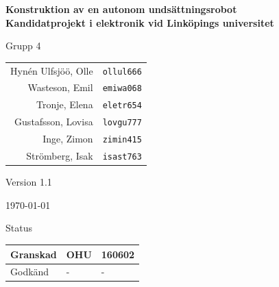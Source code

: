 \documentclass[11pt]{article}
\begin{document}
\begin{titlepage}
\begin{center}

{\Large\bfseries Konstruktion av en autonom undsättningsrobot \\ \small \bfseries Kandidatprojekt i elektronik vid Linköpings universitet}


\begin{figure}[!htbp]
  \begin{center}
\noindent{}
  \end{center}
\end{figure}


  \begin{minipage}{0.5\textwidth}
    \centering
 Grupp 4 \\
\begin{tabular}{rl}
Hynén Ulfsjöö, Olle&\verb+ollul666+
\\
Wasteson, Emil&\verb+emiwa068+
\\
Tronje, Elena&\verb+eletr654+
\\
Gustafsson, Lovisa&\verb+lovgu777+
\\
Inge, Zimon&\verb+zimin415+
\\
Strömberg, Isak&\verb+isast763+
\\
\end{tabular}
\end{minipage}%
\begin{minipage}{0.5\textwidth}
  \centering
Version 1.1

\today
\vspace{2em}

Status
\begin{longtable}{|l|l|l|} \hline

Granskad & OHU & 160602 \\ \hline
Godkänd & - & - \\ \hline
 
\end{longtable}
\end{minipage}


\end{center}
\end{titlepage}
\end{document}
